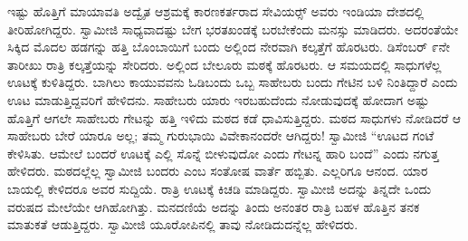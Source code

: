  ಇಷ್ಟು ಹೊತ್ತಿಗೆ ಮಾಯಾವತಿ ಅದ್ವೈತ ಆಶ್ರಮಕ್ಕೆ ಕಾರಣಕರ್ತರಾದ ಸೇವಿಯರ್ಸ್‍‍ ಅವರು ಇಂಡಿಯಾ ದೇಶದಲ್ಲಿ ತೀರಿಹೋಗಿದ್ದರು. ಸ್ವಾಮೀಜಿ ಸಾಧ್ಯವಾದಷ್ಟು ಬೇಗ ಭರತಖಂಡಕ್ಕೆ ಬರಬೇಕೆಂದು ಮನಸ್ಸು ಮಾಡಿದರು. ಅದರಂತೆಯೇ ಸಿಕ್ಕಿದ ಮೊದಲ ಹಡಗನ್ನು ಹತ್ತಿ ಬೊಂಬಾಯಿಗೆ ಬಂದು ಅಲ್ಲಿಂದ ನೇರವಾಗಿ ಕಲ್ಕತ್ತೆಗೆ ಹೊರಟರು. ಡಿಸೆಂಬರ್ ೯ನೇ ತಾರೀಖು ರಾತ್ರಿ ಕಲ್ಕತ್ತೆಯನ್ನು ಸೇರಿದರು. ಅಲ್ಲಿಂದ ಬೇಲೂರು ಮಠಕ್ಕೆ ಹೊರಟರು. ಆ ಸಮಯದಲ್ಲಿ ಸಾಧುಗಳೆಲ್ಲ ಊಟಕ್ಕೆ ಕುಳಿತಿದ್ದರು. ಬಾಗಿಲು ಕಾಯುವವನು ಓಡಿಬಂದು ಒಬ್ಬ ಸಾಹೇಬರು ಬಂದು ಗೇಟಿನ ಬಳಿ ನಿಂತಿದ್ದಾರೆ ಎಂದು ಊಟ ಮಾಡುತ್ತಿದ್ದವರಿಗೆ ಹೇಳಿದನು. ಸಾಹೇಬರು ಯಾರು ಇರಬಹುದೆಂದು ನೋಡುವುದಕ್ಕೆ ಹೋದಾಗ ಅಷ್ಟು ಹೊತ್ತಿಗೆ ಆಗಲೇ ಸಾಹೇಬರು ಗೇಟನ್ನು ಹತ್ತಿ ಇಳಿದು ಮಠದ ಕಡೆ ಧಾವಿಸುತ್ತಿದ್ದರು. ಮಠದ ಸಾಧುಗಳು ನೋಡಿದರೆ ಆ ಸಾಹೇಬರು ಬೇರೆ ಯಾರೂ ಅಲ್ಲ; ತಮ್ಮ ಗುರುಭಾಯಿ ವಿವೇಕಾನಂದರೇ ಆಗಿದ್ದರು! ಸ್ವಾಮೀಜಿ “ಊಟದ ಗಂಟೆ ಕೇಳಿಸಿತು. ಆಮೇಲೆ ಬಂದರೆ ಊಟಕ್ಕೆ ಎಲ್ಲಿ ಸೊನ್ನೆ ಬೀಳುವುದೋ ಎಂದು ಗೇಟನ್ನ ಹಾರಿ ಬಂದೆ” ಎಂದು ನಗುತ್ತ ಹೇಳಿದರು. ಮಠದಲ್ಲೆಲ್ಲ ಸ್ವಾಮೀಜಿ ಬಂದರು ಎಂಬ ಸಂತೋಷ ವಾರ್ತೆ ಹಬ್ಬಿತು. ಎಲ್ಲರಿಗೂ ಆನಂದ. ಯಾರ ಬಾಯಲ್ಲಿ ಕೇಳಿದರೂ ಅವರ ಸುದ್ದಿಯೆ. ರಾತ್ರಿ ಊಟಕ್ಕೆ ಕಿಚಡಿ ಮಾಡಿದ್ದರು. ಸ್ವಾಮೀಜಿ ಅದನ್ನು ತಿನ್ನದೇ ಒಂದು ವರುಷದ ಮೇಲೆಯೇ ಆಗಿಹೋಗಿತ್ತು. ಮನದಣಿಯೆ ಅದನ್ನು ತಿಂದು ಅನಂತರ ರಾತ್ರಿ ಬಹಳ ಹೊತ್ತಿನ ತನಕ ಮಾತುಕತೆ ಆಡುತ್ತಿದ್ದರು. ಸ್ವಾಮೀಜಿ ಯೂರೋಪಿನಲ್ಲಿ ತಾವು ನೋಡಿದುದನ್ನೆಲ್ಲ ಹೇಳಿದರು. 

